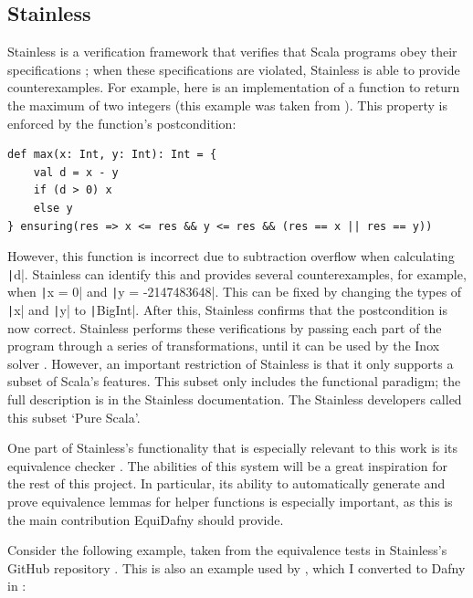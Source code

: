 \subsection{Stainless}

Stainless is a verification framework that verifies that Scala programs obey their specifications \parencite{IntroductionStainless091}; when these specifications are violated, Stainless is able to provide counterexamples. For example, here is an implementation of a function to return the maximum of two integers (this example was taken from \textcite{piskacProceedings21stConference2021}). This property is enforced by the function's postcondition:
\begin{verbatim}
def max(x: Int, y: Int): Int = {
    val d = x - y
    if (d > 0) x
    else y
} ensuring(res => x <= res && y <= res && (res == x || res == y))
\end{verbatim}
%
However, this function is incorrect due to subtraction overflow when calculating \texttt|d|. Stainless can identify this and provides several counterexamples, for example, when \texttt|x = 0| and \texttt|y = -2147483648|. This can be fixed by changing the types of \texttt|x| and \texttt|y| to \texttt|BigInt|. After this, Stainless confirms that the postcondition is now correct. 
Stainless performs these verifications by passing each part of the program through a series of transformations, until it can be used by the Inox solver \parencite{EpfllaraInox2026}. However, an important restriction of Stainless is that it only supports a subset of Scala's features. This subset only includes the functional paradigm; the full description is in the Stainless documentation. The Stainless developers called this subset `Pure Scala'.

One part of Stainless's functionality that is especially relevant to this work is its equivalence checker \parencite{IntroductionStainless091,milovancevicProvingDisprovingEquivalence2023}. The abilities of this system will be a great inspiration for the rest of this project. In particular, its ability to automatically generate and prove equivalence lemmas for helper functions is especially important, as this is the main contribution EquiDafny should provide. 

Consider the following example, taken from the equivalence tests in Stainless's GitHub repository \parencite{StainlessFrontendsBenchmarks}. This is also an example used by \textcite{milovancevicProvingDisprovingEquivalence2023}, which I converted to Dafny in :

